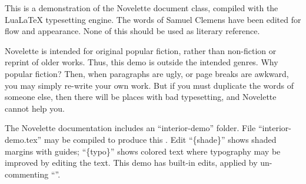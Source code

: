 \documentclass[../interior-demo.tex]{subfiles}
\begin{document}
\begin{fullpage} %
\begin{upperpage}
\null\null\null\null %
\null\null %
\end{upperpage}
\begin{blockindent}[2,2]
\noindent This is a demonstration of the Novelette document
class, compiled with the LuaLaTeX typesetting engine.
The words of Samuel Clemens have been edited for flow and appearance.
None of this should be used as literary reference.\par
Novelette is intended for original popular fiction, rather than
non-fiction or reprint of older works. Thus, this demo is outside the intended
genres. Why  popular fiction? Then, when paragraphs are ugly,
or page breaks are awkward, you may simply re-write your own work.
But if you must duplicate the words of someone else, then there will be places
with bad typesetting, and Novelette cannot help you.\par 
The Novelette documentation includes an ``interior-demo'' folder.
File ``interior-demo.tex'' may be compiled to produce this .
Edit ``\string\mode\{shade\}'' shows shaded margins with guides;
``\string\mode\{typo\}'' shows colored text where typography may be
improved by editing the text. This demo has built-in edits,
applied by un-commenting ``\string\editstrue''.\par
\end{blockindent}
\end{fullpage}


\blankpage %
\end{document}
